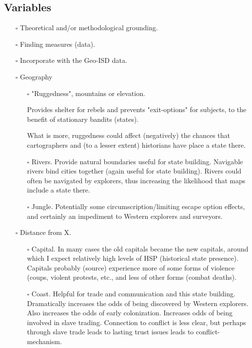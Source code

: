 \documentclass[12pt]{article}
\begin{document}
\subsection{Variables}
\begin{itemize}
	\item[$\square$] Theoretical and/or methodological grounding.

	\item[$\square$] Finding measures (data).

	\item[$\square$] Incorporate with the Geo-ISD data.

	\item[$\square$] Geography
	\begin{itemize}
		\item[$\square$] "Ruggedness", mountains or elevation.

			Provides shelter for rebels and prevents "exit-options"
			for subjects, to the benefit of stationary bandits
			(states).

			What is more, ruggedness could affect (negatively) the
			chances that cartographers and (to a lesser extent)
			historians have place a state there.


		\item[$\square$] Rivers.
			Provide natural boundaries useful for state building.
			Navigable rivers bind cities together (again useful for
			state building). Rivers could often be navigated by
			explorers, thus increasing the likelihood that maps
			include a state there.

		\item[$\square$] Jungle. Potentially some
			circumscription/limiting escape option effects, and
			certainly an impediment to Western explorers and
			surveyors.
	\end{itemize}

	\item[$\square$] Distance from X.
	\begin{itemize}
		\item[$\square$] Capital. In many cases the old capitals became
			the new capitals, around which I expect relatively high
			levels of HSP (historical state presence). Capitals
			probably (source) experience more of some forms of
			violence (coups, violent protests, etc., and less of
			other forms (combat deaths).

		\item[$\square$] Coast. Helpful for trade and communication and
			this state building. Dramatically increases the odds of
			being discovered by Western explorers. Also increases
			the odds of early colonization. Increases odds of being
			involved in slave trading. Connection to conflict is
			less clear, but perhaps through \citet{Nunn2008} slave
			trade leads to lasting trust issues leads to
			conflict-mechanism.


\end{itemize}
\end{itemize}
\end{document}
